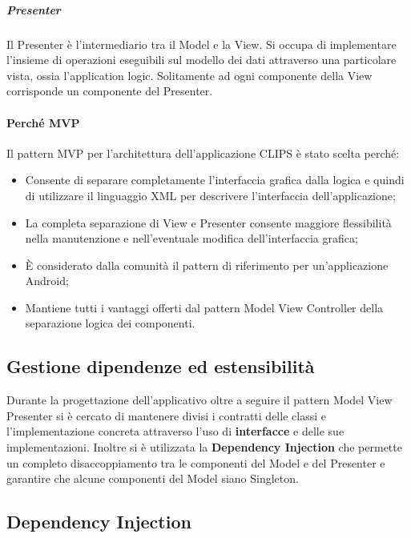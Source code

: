 \documentclass[../ManualeSviluppatore.tex]{subfiles}
\begin{document}
				\subparagraph*{Presenter}
					Il Presenter è l'intermediario tra il Model e la View. Si occupa di implementare l'insieme di operazioni eseguibili sul modello dei dati attraverso una particolare vista, ossia l'application logic. Solitamente ad ogni componente della View corrisponde un componente del Presenter.
					
			\paragraph{Perché MVP}
				Il pattern MVP per l'architettura dell'applicazione CLIPS è stato scelta perché:
				\begin{itemize}
					\item Consente di separare completamente l'interfaccia grafica dalla logica e quindi di utilizzare il linguaggio XML per descrivere l'interfaccia dell'applicazione;
					\item La completa separazione di View e Presenter consente maggiore flessibilità nella manutenzione e nell'eventuale modifica dell'interfaccia grafica;
					\item È considerato dalla comunità il pattern di riferimento per un'applicazione Android;
					\item Mantiene tutti i vantaggi offerti dal pattern Model View Controller della separazione logica dei componenti.
				\end{itemize}
	
	
	\subsection{Gestione dipendenze ed estensibilità}
		Durante la progettazione dell'applicativo oltre a seguire il pattern Model View Presenter si è cercato di mantenere divisi i contratti delle classi e l'implementazione concreta attraverso l'uso di \textbf{interfacce} e delle sue implementazioni.
		Inoltre si è utilizzata la \textbf{Dependency Injection} che permette un completo disaccoppiamento tra le componenti del Model e del Presenter e garantire che alcune componenti del Model siano Singleton.
		
	\subsection{Dependency Injection}
\end{document}
